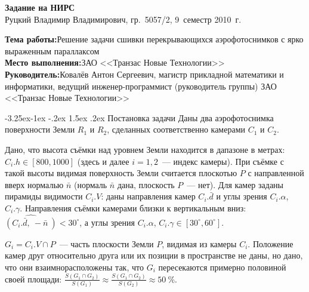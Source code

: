 \documentclass[a4paper,10pt]{article}
\makeatletter
\renewcommand\paragraph{\@startsection{paragraph}{4}{\z@}%
  {-3.25ex\@plus -1ex \@minus -.2ex}%
  {1.5ex \@plus .2ex}%
  {\normalfont\normalsize\bfseries}}
\makeatother
\begin{document}
\begin{center}
\begin{spacing}{1.5}
  {\Large\bfseries Задание на НИРС} \\
  {\large Руцкий Владимир Владимирович, гр.~5057/2, 9~семестр 2010~г.}
\end{spacing}
\end{center}

\noindent\textbf{Тема работы:}\quad Решение задачи сшивки перекрывающихся аэрофотоснимков с ярко выраженным параллаксом \\
\textbf{Место выполнения:}\quad ЗАО <<Транзас Новые Технологии>> \\
\textbf{Руководитель:}\quad Ковалёв Антон Сергеевич, 
магистр прикладной математики и информатики, 
ведущий инженер-программист (руководитель группы) ЗАО <<Транзас Новые Технологии>>

\paragraph{Постановка задачи}
Даны два аэрофотоснимка поверхности Земли $R_1$ и $R_2$, 
сделанных соответственно камерами $C_1$ и $C_2$.

Дано, что высота съёмки над уровнем Земли находится в дапазоне в метрах: $C_i.h \in [800, 1000]$ (здесь и далее $i=1,2$~--- индекс камеры).
При съёмке с такой высоты видимая поверхность Земли считается плоскотью $P$ с направленной вверх нормалью $\bar{n}$
(нормаль $\bar{n}$ дана, плоскость $P$~--- нет).
Для камер заданы пирамиды видимости $C_i.V$: 
даны направления камер $C_i.\bar{d}$ и углы зрения $C_i.\alpha$, $C_i.\gamma$.
Направления съёмки камерами близки к вертикальным вниз: $\widehat{(C_i.\bar{d}, \ -\bar{n}\ )} < 30^{\circ}$, %
а углы зрения $C_i.\alpha$, $C_i.\gamma \in [30^{\circ}, 60^{\circ}]$.

$G_i = C_i.V \cap P$~--- часть плоскости Земли $P$, видимая из камеры $C_i$.
Положение камер друг относительно друга или их позиции в пространстве не даны, но
дано, что они взаимнорасположены так, что $G_i$ пересекаются примерно половиной своей площади:
$\frac{S(G_1 \cap G_2)}{S(G_1)} \approx \frac{S(G_1 \cap G_2)}{S(G_2)} \approx 50~\%$.
\end{document}
